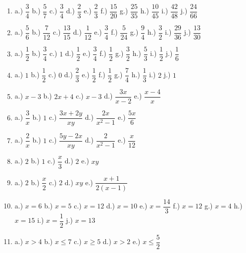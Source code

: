 \documentclass[a4paper,12pt]{letter}
\begin{document}
\begin{enumerate}
\item a.) $\dfrac{3}{4}$ \quad b.) $\dfrac{5}{7}$ \quad c.) $\dfrac{3}{4}$ \quad d.) $\dfrac{2}{3}$ \quad
      e.) $\dfrac{2}{3}$ \quad f.) $\dfrac{15}{20}$ \quad g.) $\dfrac{25}{35}$ \quad h.) $\dfrac{10}{45}$ \quad
      i.) $\dfrac{42}{48}$ \quad j.) $\dfrac{24}{66}$

\item a.) $\dfrac{5}{6}$ \quad b.) $\dfrac{7}{12}$ \quad c.) $\dfrac{13}{15}$ \quad d.) $\dfrac{1}{12}$ \quad
      e.) $\dfrac{3}{4}$ \quad f.) $\dfrac{5}{24}$ \quad g.) $\dfrac{9}{4}$ \quad h.) $\dfrac{3}{2}$ \quad
      i.) $\dfrac{29}{36}$ \quad j.) $\dfrac{13}{30}$

\item a.) $\dfrac{1}{2}$ \quad b.) $\dfrac{3}{4}$ \quad c.) $1$ \quad d.) $\dfrac{1}{2}$ \quad
      e.) $\dfrac{3}{4}$ \quad f.) $\dfrac{1}{2}$ \quad g.) $\dfrac{3}{2}$ \quad h.) $\dfrac{5}{3}$ \quad
      i.) $\dfrac{1}{2}$ \quad j.) $\dfrac{1}{6}$

\item a.) $1$ \quad b.) $\dfrac{1}{2}$ \quad c.) $0$ \quad d.) $\dfrac{2}{3}$ \quad e.) $\dfrac{1}{2}$ \quad
      f.) $\dfrac{1}{2}$ \quad g.) $\dfrac{7}{4}$ \quad h.) $\dfrac{1}{3}$ \quad i.) $2$ \quad j.) $1$

\item a.) $x-3$ \quad b.) $2x+4$ \quad c.) $x-3$ \quad d.) $\dfrac{3x}{x-2}$ \quad e.) $\dfrac{x-4}{x}$

\item a.) $\dfrac{3}{x}$ \quad b.) $1$ \quad c.) $\dfrac{3x+2y}{xy}$ \quad d.) $\dfrac{2x}{x^2-1}$ \quad
      e.) $\dfrac{5x}{6}$

\item a.) $\dfrac{2}{x}$ \quad b.) $1$ \quad c.) $\dfrac{5y-2x}{xy}$ \quad d.) $\dfrac{2}{x^2-1}$ \quad
      e.) $\dfrac{x}{12}$

\item a.) $2$ \quad b.) $1$ \quad c.) $\dfrac{x}{3}$ \quad d.) $2$ \quad e.) $xy$

\item a.) $2$ \quad b.) $\dfrac{x}{2}$ \quad c.) $2$ \quad d.) $xy$ \quad e.) $\dfrac{x+1}{2(x-1)}$

\item a.) $x=6$ \quad b.) $x=5$ \quad c.) $x=12$ \quad d.) $x=10$ \quad e.) $x=\dfrac{14}{3}$ \quad
      f.) $x=12$ \quad g.) $x=4$ \quad h.) $x=15$ \quad i.) $x=\dfrac{1}{2}$ \quad j.) $x=13$

\item a.) $x>4$ \quad b.) $x\le7$ \quad c.) $x\ge5$ \quad d.) $x>2$ \quad e.) $x\le\dfrac{5}{2}$


\end{enumerate}
\end{document}
